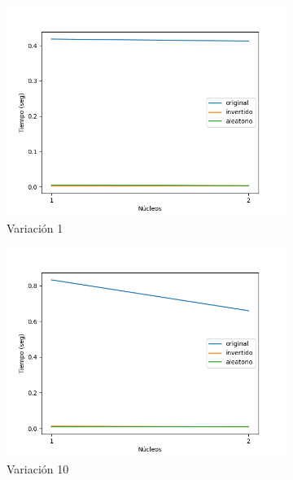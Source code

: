 \documentclass{article}
\begin{document}
\begin{figure}[h!]
       \centering
       \begin{subfigure}[b]{0.45\linewidth}
           \includegraphics[width=\linewidth]{Figure_1.1.png}
           \caption{Variaci\'on 1}
           \label{fig:westminster_lateral}
        \end{subfigure}
        \begin{subfigure}[b]{0.45\linewidth}
            \includegraphics[width=\linewidth]{Figure_1.1(10).png}
            \caption{Variaci\'on 10}
            \label{fig:westminster_aerea}
        \end{subfigure}
        \begin{subfigure}[b]{0.45\linewidth}

\end{subfigure}
\end{figure}
\end{document}
